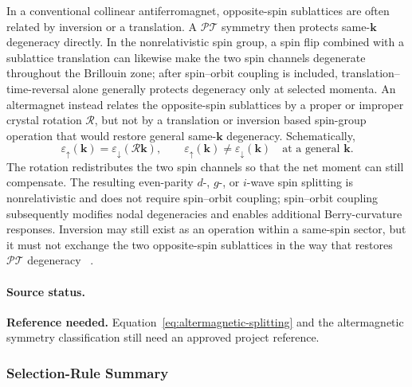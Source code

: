In a conventional collinear antiferromagnet, opposite-spin sublattices are
often related by inversion or a translation.  A $\mathcal{PT}$ symmetry then
protects same-$\mathbf{k}$ degeneracy directly.  In the nonrelativistic spin
group, a spin flip combined with a sublattice translation can likewise make
the two spin channels degenerate throughout the Brillouin zone; after
spin--orbit coupling is included, translation--time-reversal alone generally
protects degeneracy only at selected momenta.  An altermagnet instead relates
the opposite-spin sublattices by a proper or improper crystal rotation
$\mathcal{R}$, but not by a translation or inversion based spin-group
operation that would restore general same-$\mathbf{k}$ degeneracy.
Schematically,
\begin{equation}
    \varepsilon_{\uparrow}(\mathbf{k})
    =\varepsilon_{\downarrow}(\mathcal{R}\mathbf{k}),
    \qquad
    \varepsilon_{\uparrow}(\mathbf{k})
    \ne\varepsilon_{\downarrow}(\mathbf{k})
    \quad\text{at a general }\mathbf{k}.
    \label{eq:altermagnetic-splitting}
\end{equation}
The rotation redistributes the two spin channels so that the net moment can
still compensate.  The resulting even-parity $d$-, $g$-, or $i$-wave spin
splitting is nonrelativistic and does not require spin--orbit coupling;
spin--orbit coupling subsequently modifies nodal degeneracies and enables
additional Berry-curvature responses.  Inversion may still exist as an
operation within a same-spin sector, but it must not exchange the two
opposite-spin sublattices in the way that restores $\mathcal{PT}$ degeneracy
~\cite{smejkal2022altermagnet,smejkal2022altermagnet-landscape,
    jungwirth2026altermagnet-symmetry}.

\paragraph{Source status.}
\textbf{Reference needed.}  Equation~\eqref{eq:altermagnetic-splitting} and the
altermagnetic symmetry classification still need an approved project
reference.

\subsubsection{Selection-Rule Summary}

